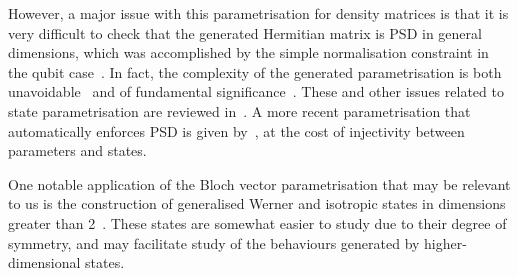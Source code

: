 \documentclass[10pt, a4paper]{article}
\numberwithin{equation}{section} %
\theoremstyle{definition}
\theoremstyle{plain}
\newcommand{\?}{\mathrel{?}} %
\begin{document}
\begin{appendices}
                          However, a major issue with this parametrisation for density matrices is that it is very difficult to check that the generated Hermitian matrix is PSD in general dimensions, which was accomplished by the simple normalisation constraint in the qubit case~\cite{DensMatParam}. In fact, the complexity of the generated parametrisation is both unavoidable~\cite{NoHigherEuclideanRepr} and of fundamental significance~\cite{InfoAsymStateSpace}. These and other issues related to state parametrisation are reviewed in~\cite{DensMatParam}. A more recent parametrisation that automatically enforces PSD is given by~\cite{SquaringParam}, at the cost of injectivity between parameters and states.

                          One notable application of the Bloch vector parametrisation that may be relevant to us is the construction of generalised Werner and isotropic states in dimensions greater than 2~\cite{WernerIsotropicDecomp}. These states are somewhat easier to study due to their degree of symmetry, and may facilitate study of the behaviours generated by higher-dimensional states. 

                        \end{appendices}

                        
\end{document}
